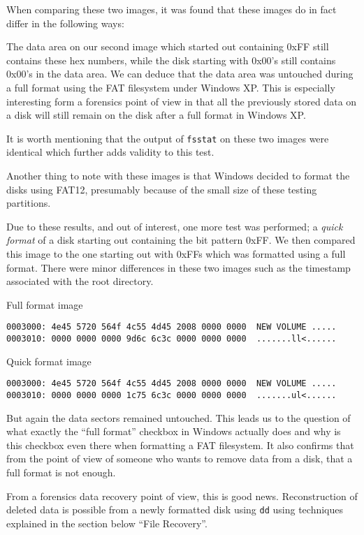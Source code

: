 \documentclass[a4paper,
    11pt,
    normalheadings,
    parindent,
    UKenglish,
    abstracton,
    ]{scrartcl}
\begin{document}
When comparing these two images, it was found that these images do in fact differ in the following ways:

The data area on our second image which started out containing 0xFF still contains these hex numbers, while the disk starting with 0x00's still contains 0x00's in the data area. We can deduce that the data area was untouched during a full format using the FAT filesystem under Windows XP. This is especially interesting form a forensics point of view in that all the previously stored data on a disk will still remain on the disk after a full format in Windows XP.

It is worth mentioning that the output of \texttt{fsstat} on these two images were identical which further adds validity to this test.

Another thing to note with these images is that Windows decided to format the disks using FAT12, presumably because of the small size of these testing partitions.

Due to these results, and out of interest, one more test was performed; a \emph{quick format} of a disk starting out containing the bit pattern 0xFF. We then compared this image to the one starting out with 0xFFs which was formatted using a full format. There were minor differences in these two images such as the timestamp associated with the root directory. 

Full format image
\begin{verbatim}
0003000: 4e45 5720 564f 4c55 4d45 2008 0000 0000  NEW VOLUME .....
0003010: 0000 0000 0000 9d6c 6c3c 0000 0000 0000  .......ll<......
\end{verbatim}

Quick format image
\begin{verbatim}
0003000: 4e45 5720 564f 4c55 4d45 2008 0000 0000  NEW VOLUME .....
0003010: 0000 0000 0000 1c75 6c3c 0000 0000 0000  .......ul<......
\end{verbatim}

But again the data sectors remained untouched. This leads us to the question of what exactly the ``full format'' checkbox in Windows actually does and why is this checkbox even there when formatting a FAT filesystem. It also confirms that from the point of view of someone who wants to remove data from a disk, that a full format is not enough. 

From a forensics data recovery point of view, this is good news. Reconstruction of deleted data is possible from a newly formatted disk using \texttt{dd} using techniques explained in the section below ``File Recovery''.
\end{document}
